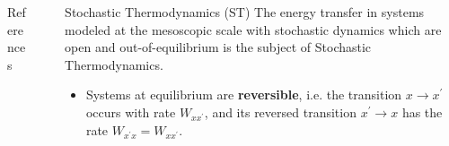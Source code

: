 \documentclass[final]{beamer}
\newlength{\sepwidth}
\newlength{\colwidth}
\newcommand{\separatorcolumn}{\begin{column}{\sepwidth}\end{column}}
\begin{document}
\begin{frame}[t]
\begin{columns}[t]
\begin{column}{\colwidth}
\begin{alertblock}{References}
\footnotesize{}

\end{alertblock}
\end{column}

\separatorcolumn

\begin{column}{\colwidth}

\begin{block}{Stochastic Thermodynamics (ST)}
\vskip10pt
\justifying
The energy transfer in systems modeled at the mesoscopic scale with stochastic dynamics which are open and out-of-equilibrium is the subject of Stochastic Thermodynamics\cite{peliti2021stochastic,Falasco:2023aa}. 
%
\begin{itemize}
\justifying
\item Systems at equilibrium are {\bf reversible}, i.e. the transition $x \rightarrow x^\prime$ occurs with rate $W_{xx^\prime}$, and its reversed transition $x^\prime \rightarrow x$ has the rate $W_{x^\prime x}=W_{xx^\prime}$.


\end{itemize}
\end{block}
\end{column}
\end{columns}
\end{frame}
\end{document}
